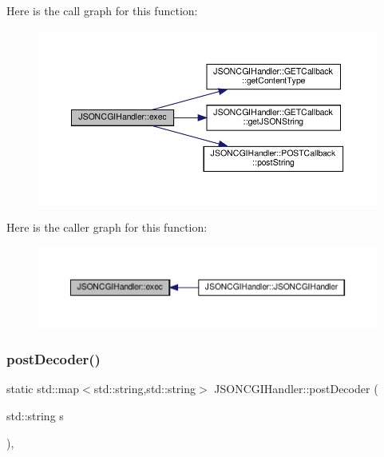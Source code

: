 Here is the call graph for this function\+:
\nopagebreak
\begin{figure}[H]
\begin{center}
\leavevmode
\includegraphics[width=350pt]{classJSONCGIHandler_a42518cd5ad781476d299b50e4c4c0000_cgraph}
\end{center}
\end{figure}
Here is the caller graph for this function\+:
\nopagebreak
\begin{figure}[H]
\begin{center}
\leavevmode
\includegraphics[width=350pt]{classJSONCGIHandler_a42518cd5ad781476d299b50e4c4c0000_icgraph}
\end{center}
\end{figure}
\mbox{\label{classJSONCGIHandler_a0f208af3dd050ed182967fe9cca42d78}} 
\subsubsection{\texorpdfstring{post\+Decoder()}{postDecoder()}}
{\footnotesize\ttfamily static std\+::map$<$std\+::string,std\+::string$>$ J\+S\+O\+N\+C\+G\+I\+Handler\+::post\+Decoder (\begin{DoxyParamCaption}\item[{std\+::string}]{s }\end{DoxyParamCaption})\hspace{0.3cm}{\ttfamily [inline]}, {\ttfamily [static]}}

